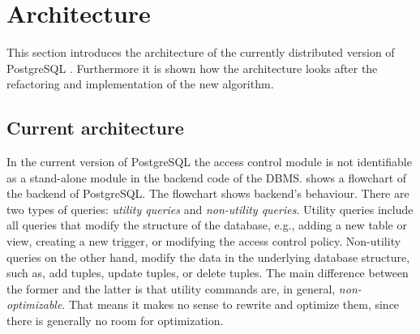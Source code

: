 \section{Architecture}
%
This section introduces the architecture of the currently distributed version of PostgreSQL .
%
Furthermore it is shown how the architecture looks after the refactoring and implementation of the new algorithm.
%
\subsection{Current architecture}


%
In the current version of PostgreSQL the access control module is not identifiable as a stand-alone module in the backend code of the DBMS.
%
 shows a flowchart of the backend of PostgreSQL. The flowchart shows backend's behaviour.
%
There are two types of queries: \emph{utility queries} and \emph{non-utility queries}.
%
Utility queries include all queries that modify the structure of the database, e.g., adding a new table or view, creating a new trigger, or modifying the access control policy.
%
Non-utility queries on the other hand, modify the data in the underlying database structure, such as, add tuples, update tuples, or delete tuples.
%
The main difference between the former and the latter is that utility commands  are, in general, \emph{non-optimizable}. 
%
%
That means it makes no sense to rewrite and optimize them, since there is generally no room for optimization.

